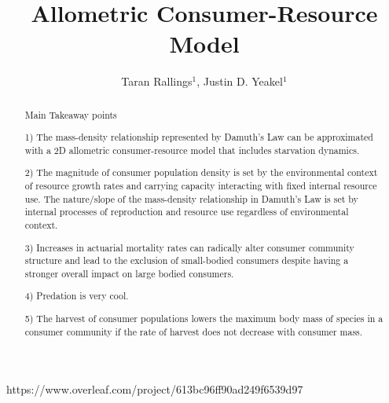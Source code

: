 \documentclass[]{rsos}%
\begin{document}
\title{Allometric Consumer-Resource Model}

\author{%
Taran Rallings$^{1}$, Justin D. Yeakel$^{1}$} 

\address{$^{1}$School of Natural Science, University of California Merced}

\subject{foodwebs, paleontology, ecology}
https://www.overleaf.com/project/613bc96ff90ad249f6539d97


\begin{abstract}
Main Takeaway points

1) The mass-density relationship represented by Damuth's Law can be approximated with a 2D allometric consumer-resource model that includes starvation dynamics.

2) The magnitude of consumer population density is set by the environmental context of resource growth rates and carrying capacity interacting with fixed internal resource use. The nature/slope of the mass-density relationship in Damuth's Law is set by internal processes of reproduction and resource use regardless of environmental context. 

3) Increases in actuarial mortality rates can radically alter consumer community structure and lead to the exclusion of small-bodied consumers despite having a stronger overall impact on large bodied consumers.  

4) Predation is very cool. 

5) The harvest of consumer populations lowers the maximum body mass of species in a consumer community if the rate of harvest does not decrease with consumer mass. 

\end{abstract}


\maketitle
\end{document}

